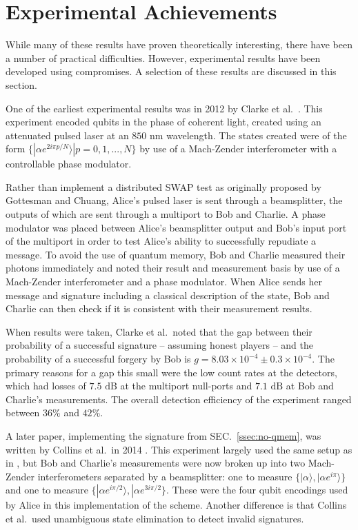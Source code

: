 \documentclass[%
 reprint,
 amsmath,amssymb,
 aps,
 pra,
]{revtex4-1}
\begin{document}
\section{Experimental Achievements}
\label{sec:experiments}

While many of these results have proven theoretically interesting, there have been a number of practical difficulties. However, experimental results have been developed using compromises. A selection of these results are discussed in this section.

One of the earliest experimental results was in 2012 by Clarke et al.\ \cite{CCD+12}. This experiment encoded qubits in the phase of coherent light, created using an attenuated pulsed laser at an $850 \text{ nm}$ wavelength. The states created were of the form $\{|\alpha e^{2i\pi p/N}\rangle| p = 0,1,...,N\}$ by use of a Mach-Zender interferometer with a controllable phase modulator.

Rather than implement a distributed SWAP test as originally proposed by Gottesman and Chuang, Alice's pulsed laser is sent through a beamsplitter, the outputs of which are sent through a multiport to Bob and Charlie. A phase modulator was placed between Alice's beamsplitter output and Bob's input port of the multiport in order to test Alice's ability to successfully repudiate a message. To avoid the use of quantum memory, Bob and Charlie measured their photons immediately and noted their result and measurement basis by use of a Mach-Zender interferometer and a phase modulator. When Alice sends her message and signature including a classical description of the state, Bob and Charlie can then check if it is consistent with their measurement results.

When results were taken, Clarke et al.\ noted that the gap between their probability of a successful signature -- assuming honest players -- and the probability of a successful forgery by Bob is $g = 8.03 \times 10^{-4} \pm 0.3 \times 10^{-4}$. The primary reasons for a gap this small were the low count rates at the detectors, which had losses of $7.5 \text{ dB}$ at the multiport null-ports and $7.1 \text{ dB}$ at Bob and Charlie's measurements. The overall detection efficiency of the experiment ranged between $36\%$ and $42\%$.

A later paper, implementing the signature from SEC.\ \ref{ssec:no-qmem}, was written by Collins et al.\ in 2014 \cite{PhysRevLett.113.040502}. This experiment largely used the same setup as in \cite{CCD+12}, but Bob and Charlie's measurements were now broken up into two Mach-Zender interferometers separated by a beamsplitter: one to measure $\{|\alpha\rangle, |\alpha e^{i\pi}\rangle\}$ and one to measure $\{|\alpha e^{i\pi/2}\rangle, |\alpha e^{3i\pi/2}\}$. These were the four qubit encodings used by Alice in this implementation of the scheme. Another difference is that Collins et al.\ used unambiguous state elimination to detect invalid signatures.
\end{document}
